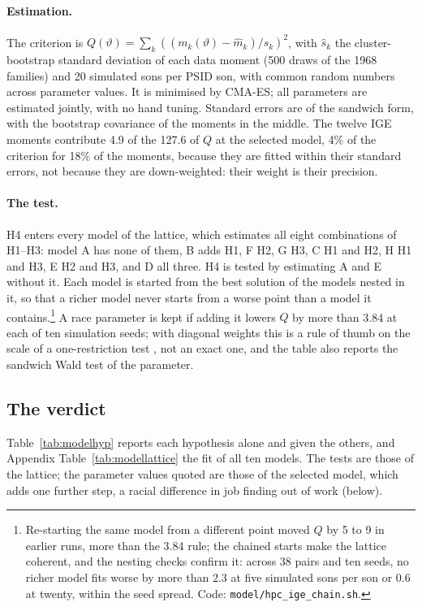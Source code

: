 \paragraph{Estimation.} The criterion is $Q(\vartheta) = \sum_k ((m_k(\vartheta) - \hat m_k)/\hat s_k)^2$, with $\hat s_k$
the cluster-bootstrap standard deviation of each data moment (500 draws of the 1968 families) and 20 simulated sons per
PSID son, with common random numbers across parameter values. It is minimised by CMA-ES; all parameters are estimated
jointly, with no hand tuning. Standard errors are of the sandwich form, with the bootstrap covariance of the moments in the
middle. The twelve IGE moments contribute 4.9 of the 127.6 of $Q$ at the selected model, 4\% of the criterion for
18\% of the moments, because they are fitted within their standard errors, not because they are down-weighted: their
weight is their precision.

\paragraph{The test.} H4 enters every model of the lattice, which estimates all eight combinations of H1--H3: model A
has none of them, B adds H1, F H2, G H3, C H1 and H2, H H1 and H3, E H2 and H3, and D all three. H4 is tested by
estimating A and E without it. Each model is started from the best solution of the models nested in it, so that a
richer model never starts from a worse point than a model it contains.\footnote{Re-starting the same model from a
different point moved $Q$ by 5 to 9 in earlier runs, more than the 3.84 rule; the chained starts make the lattice
coherent, and the nesting checks confirm it: across 38 pairs and ten seeds, no richer model fits worse by more than 2.3
at five simulated sons per son or 0.6 at twenty, within the seed spread. Code: \texttt{model/hpc\_ige\_chain.sh}.}
A race parameter is kept if adding it lowers $Q$ by more than 3.84 at each of ten simulation seeds; with diagonal weights
this is a rule of thumb on the scale of a one-restriction test \citep{newey1987hypothesis}, not an exact one, and the
table also reports the sandwich Wald test of the parameter.

\subsection{The verdict}

Table~\ref{tab:modelhyp} reports each hypothesis alone and given the others, and Appendix Table~\ref{tab:modellattice}
the fit of all ten models. The tests are those of the lattice; the parameter values quoted are those of the selected
model, which adds one further step, a racial difference in job finding out of work (below).


